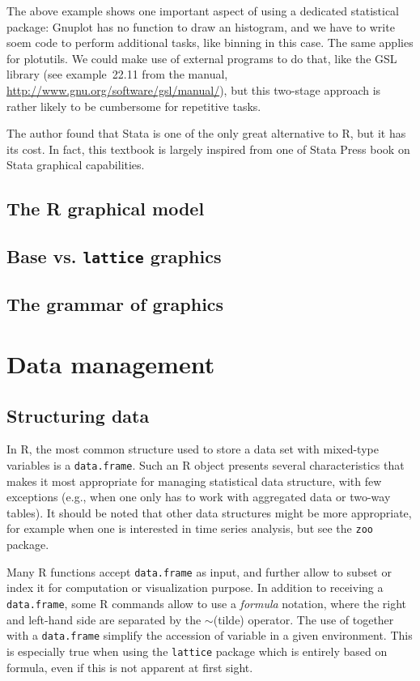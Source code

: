 \documentclass[a4paper,twoside]{book}
\renewcommand{\texttt}[1]{\lstinline{#1}}
\newcommand{\R}{\textsf{R}\xspace}
\newcommand{\mytilde}{\textcolor{myred3}{$\sim$}\xspace}
\begin{document}
The above example shows one important aspect of using a dedicated
statistical package: \textsf{Gnuplot} has no function to draw an
histogram, and we have to write soem code to perform additional tasks,
like binning in this case. The same applies for
\textsf{plotutils}. We could make use of external programs to do that,
like the \textsf{GSL} library (see example~22.11 from the manual,
\url{http://www.gnu.org/software/gsl/manual/}), but this two-stage
approach is rather likely to be cumbersome for repetitive tasks.

The author found that \textsf{Stata} is one of the only great
alternative to \R, but it has its cost. In fact, this textbook is
largely inspired from one of Stata Press book on \textsf{Stata}
graphical capabilities\autocite{mitchell08}.

\section{The \R graphical model}

\section{Base vs. \texttt{lattice} graphics}

\section{The grammar of graphics}

\chapter{Data management}

\section{Structuring data}
In R, the most common structure used to store a data set with
mixed-type variables is a \texttt{data.frame}. Such an \R object
presents several characteristics that makes it most appropriate for
managing statistical data structure, with few exceptions (e.g., when
one only has to work with aggregated data or two-way tables). It
should be noted that other data structures might be more appropriate,
for example when one is interested in time series analysis, but see
the \texttt{zoo} package\autocite{zeilis05}.

Many \R functions accept \texttt{data.frame} as input, and further
allow to subset or index it for computation or visualization
purpose. In addition to receiving a \texttt{data.frame}, some \R
commands allow to use a \emph{formula} notation, where the right and
left-hand side are separated by the \mytilde (tilde) operator. The
use of  together with a \texttt{data.frame} simplify the
accession of variable in a given environment.
This is especially true when using the \texttt{lattice} package which
is entirely based on formula, even if this is not apparent at
first sight.
\end{document}
